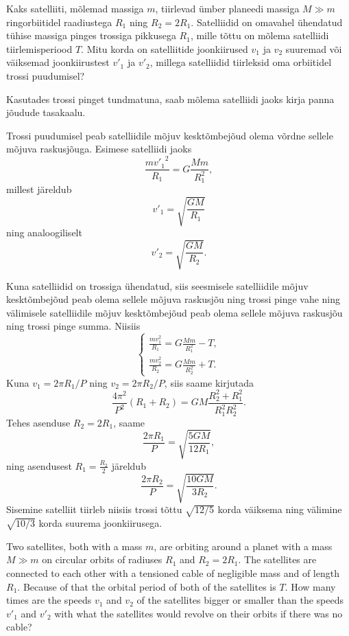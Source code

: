 
Kaks satelliiti, mõlemad massiga $m$, tiirlevad ümber planeedi massiga $M\gg m$ ringorbiitidel raadiustega $R_1$ ning $R_2=2R_1$. Satelliidid on omavahel ühendatud tühise massiga pinges trossiga pikkusega $R_1$, mille tõttu on mõlema satelliidi tiirlemisperiood $T$. Mitu korda on satelliitide joonkiirused $v_1$ ja $v_2$ suuremad või väiksemad joonkiirustest $v'_1$ ja $v'_2$, millega satelliidid tiirleksid oma orbiitidel trossi puudumisel?

\hint
Kasutades trossi pinget tundmatuna, saab mõlema satelliidi jaoks kirja panna jõudude tasakaalu.

\solu
Trossi puudumisel peab satelliidile mõjuv kesktõmbejõud olema võrdne sellele mõjuva raskusjõuga. Esimese satelliidi jaoks
\[
\frac{{mv'_1}^2}{R_1}=G\frac{Mm}{R_1^2},
\]
millest järeldub
\[
v'_1=\sqrt{\frac{GM}{R_1}}
\]
ning analoogiliselt
\[
v'_2=\sqrt{\frac{GM}{R_2}}.
\]

Kuna satelliidid on trossiga ühendatud, siis seesmisele satelliidile mõjuv kesktõmbejõud peab olema sellele mõjuva raskusjõu ning trossi pinge vahe ning välimisele satelliidile mõjuv kesktõmbejõud peab olema sellele mõjuva raskusjõu ning trossi pinge summa. Niisiis
$$\begin{cases}
\frac{mv_1^2}{R_1}=G\frac{Mm}{R_1^2}-T,\\
\frac{mv_2^2}{R_2}=G\frac{Mm}{R_2^2}+T.
\end{cases}$$ 
Kuna $v_1=2\pi R_1/P$ ning $v_2=2\pi R_2/P$, siis saame kirjutada
$$\frac{4\pi^2}{P^2}\left(R_1+R_2\right)=GM\frac{R_2^2+R_1^2}{R_1^2R_2^2}.$$
Tehes asenduse $R_2=2R_1$, saame
\[
\frac{2\pi R_1}{P}=\sqrt{\frac{5GM}{12R_1}},
\]
ning asendusest $R_1=\frac{R_2}{2}$ järeldub
\[
\frac{2\pi R_2}{P}=\sqrt{\frac{10GM}{3R_2}}.
\]
Sisemine satelliit tiirleb niisiis trossi tõttu $\sqrt{12/5}$ korda väiksema ning välimine $\sqrt{10/3}$ korda suurema joonkiirusega.

Two satellites, both with a mass $m$, are orbiting around a planet with a mass $M\gg m$ on circular orbits of radiuses $R_1$ and $R_2=2R_1$. The satellites are connected to each other with a tensioned cable of negligible mass and of length $R_1$. Because of that the orbital period of both of the satellites is $T$. How many times are the speeds $v_1$ and $v_2$ of the satellites bigger or smaller than the speeds $v'_1$ and $v'_2$ with what the satellites would revolve on their orbits if there was no cable?

